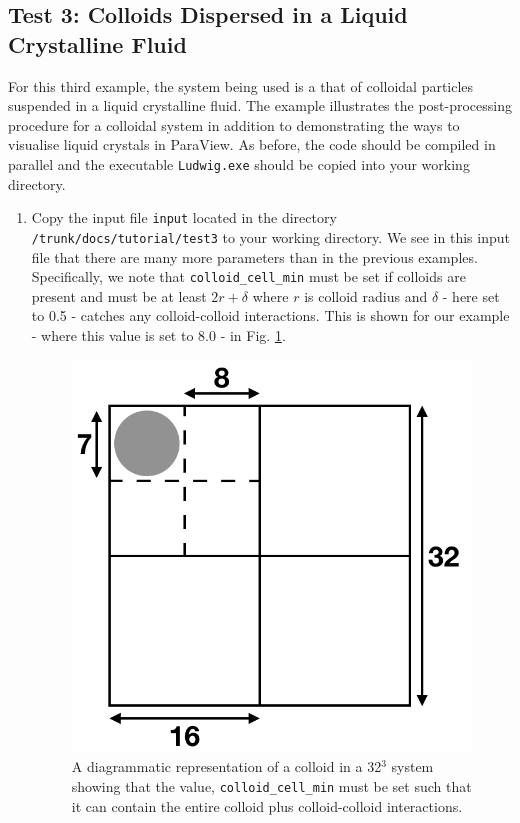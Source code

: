 \documentclass[11pt,twoside,a4paper]{article}
\begin{document}
\subsection{Test 3: Colloids Dispersed in a Liquid Crystalline Fluid}

For this third example, the system being used is a that of colloidal particles suspended in 
a liquid crystalline fluid.
The example illustrates the post-processing procedure for a colloidal system in addition to 
demonstrating the ways to visualise liquid crystals in ParaView. 
As before, the code should be compiled in parallel and the executable 
\texttt{Ludwig.exe} should be copied into your working directory.

\begin{enumerate}
\item Copy the input file \texttt{input} located in the directory 
\texttt{/trunk/docs/tutorial/test3} to your working directory. We see in this input file that 
there are many more parameters 
than in the previous examples. Specifically, we note that \texttt{colloid\_cell\_min} 
must be set if colloids are present and must be at least $2r + \delta$ where $r$ is colloid 
radius and $\delta$ - here set to 0.5 - catches any colloid-colloid interactions. This is shown for our example - where this value is set to 8.0 - in Fig. \ref{fig:colloid_int}.

 \begin{figure}[H]
\begin{center}
\includegraphics[width=0.5\linewidth]{colloidInit.png}
  \caption{A diagrammatic representation of a colloid in a 32$^3$ system showing that the value, \texttt{colloid\_cell\_min} must be set such that it can contain the entire colloid plus colloid-colloid interactions.}
  \label{fig:colloid_int}
  \end{center}
\end{figure}


\end{enumerate}
\end{document}
